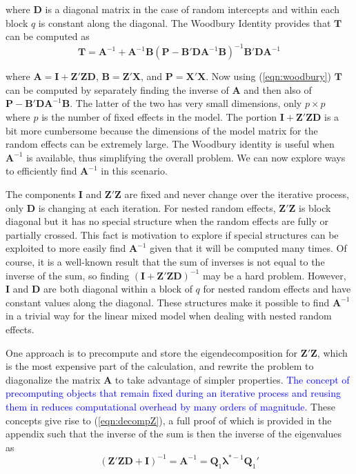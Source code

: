 \documentclass[12pt]{article}
\begin{document}
\noindent where $\bm{D}$ is a diagonal matrix in the case of random intercepts and within each block $q$ is constant along the diagonal. The Woodbury Identity provides that $\bm{T}$ can be computed as
\begin{equation}
	\label{eqn:woodbury}
	\bm{T} = \bm{A}^{-1} + \bm{A}^{-1}\bm{B}\left(\bm{P} - \bm{B}'\bm{D}\bm{A}^{-1}\bm{B}\right)^{-1}\bm{B}'\bm{D}\bm{A}^{-1}
\end{equation}

\noindent where $\bm{A} = \bm{I} +  \bm{Z}'\bm{Z}\bm{D}$, $\bm{B} = \bm{Z}'\bm{X}$, and $\bm{P} = \bm{X}'\bm{X}$. Now using (\ref{eqn:woodbury}) $\bm{T}$ can be computed by separately finding the inverse of $\bm{A}$ and then also of $\bm{P} - \bm{B}'\bm{D}\bm{A}^{-1}\bm{B}$. The latter of the two has very small dimensions, only $p \times p$ where $p$ is the number of fixed effects in the model. The portion $\bm{I} + \bm{Z}'\bm{Z}\bm{D}$ is a bit more cumbersome because the dimensions of the model matrix for the random effects can be extremely large. The Woodbury identity is useful when $\bm{A}^{-1}$ is available, thus simplifying the overall problem. We can now explore ways to efficiently find $\bm{A}^{-1}$ in this scenario.

The components $\bm{I}$ and $\bm{Z}'\bm{Z}$ are fixed and never change over the iterative process, only $\bm{D}$ is changing at each iteration. For nested random effects, $\bm{Z}'\bm{Z}$ is block diagonal but it has no special structure when the random effects are fully or partially crossed. This fact is motivation to explore if special structures can be exploited to more easily find $\bm{A}^{-1}$ given that it will be computed many times. Of course, it is a well-known result that the sum of inverses is not equal to the inverse of the sum, so finding $(\bm{I} +  \bm{Z}'\bm{Z}\bm{D})^{-1}$ may be a hard problem. However, $\bm{I}$ and $\bm{D}$ are both diagonal within a block of $q$ for nested random effects and have constant values along the diagonal. These structures make it possible to find $\bm{A}^{-1}$ in a trivial way for the linear mixed model when dealing with nested random effects. 

One approach is to precompute and store the eigendecomposition for $\bm{Z}'\bm{Z}$, which is the most expensive part of the calculation, and rewrite the problem to diagonalize the matrix $\bm{A}$ to take advantage of simpler properties. \textcolor{blue}{The concept of precomputing objects that remain fixed during an iterative process and reusing them in reduces computational overhead by many orders of magnitude.} These concepts give rise to (\ref{eqn:decompZ}), a full proof of which is provided in the appendix such that the inverse of the sum is then the inverse of the eigenvalues as  
\begin{equation}
\label{eqn:decompZ}
(\bm{Z}'\bm{Z}\bm{D} + \bm{I})^{-1} = \bm{A}^{-1} = \bm{Q}_1 \bm{\lambda}^{*-1} \bm{Q}_1'
\end{equation}
\end{document}
